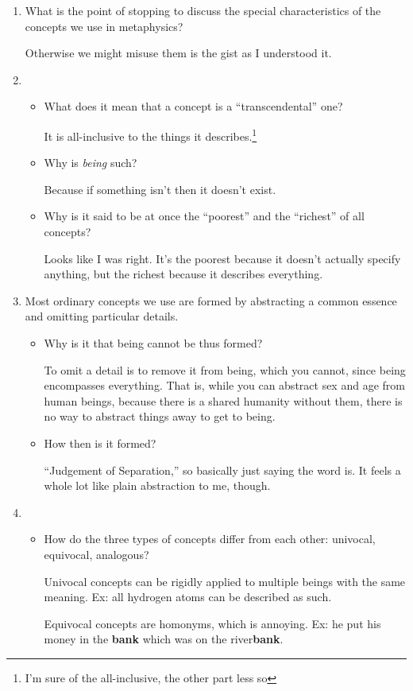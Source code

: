 \documentclass[12pt]{article}[titlepage]
\newcommand{\say}[1]{``#1''}
\newcommand{\1}{\={a}}
\newcommand{\2}{\={e}}
\newcommand{\3}{\={\i}}
\newcommand{\4}{\=o}
\newcommand{\5}{\=u}
\newcommand{\6}{\={A}}
\renewcommand{\,}{\textsuperscript{,}}
\begin{document}
\begin{enumerate}
\item What is the point of stopping to discuss the special characteristics of the concepts we use in metaphysics?

Otherwise we might misuse them is the gist as I understood it.
\item \begin{itemize}
\item What does it mean that a concept is a \say{transcendental} one?

It is all-inclusive to the things it describes.\footnote{I'm sure of the all-inclusive, the other part less so}
\item Why is \emph{being} such?

Because if something isn't then it doesn't exist.
\item Why is it said to be at once the \say{poorest} and the \say{richest} of all concepts?

Looks like I was right.
It's the poorest because it doesn't actually specify anything, but the richest because it describes everything.
\end{itemize}
\item Most ordinary concepts we use are formed by abstracting a common essence and omitting particular details.
\begin{itemize}
\item Why is it that being cannot be thus formed?

To omit a detail is to remove it from being, which you cannot, since being encompasses everything.
That is, while you can abstract sex and age from human beings, because there is a shared humanity without them, there is no way to abstract things away to get to being.
\item How then is it formed?

\say{Judgement of Separation,} so basically just saying the word is.
It feels a whole lot like plain abstraction to me, though.
\end{itemize}
\item \begin{itemize}
\item How do the three types of concepts differ from each other: univocal, equivocal, analogous?

Univocal concepts can be rigidly applied to multiple beings with the same meaning.
Ex: all hydrogen atoms can be described as such.

Equivocal concepts are homonyms, which is annoying.
Ex: he put his money in the \textbf{bank} which was on the river\textbf{bank}.


\end{itemize}
\end{enumerate}
\end{document}
